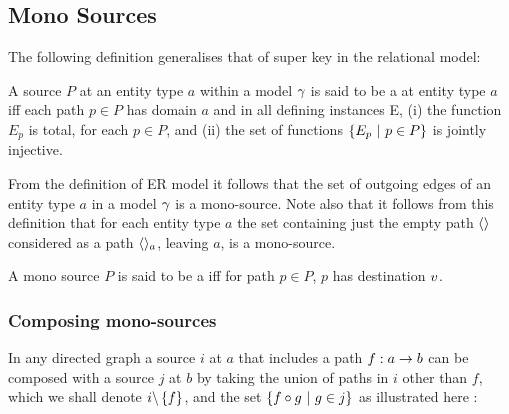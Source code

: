 \subsection{Mono Sources}

The following definition generalises that of super key in the relational model:
\begin{definition}
A source $P$  at an entity type $a$ within a model $\gamma$ is said to be a  at entity type $a$ iff each path $p \in P$ has domain $a$ and  in all defining instances E, 
(i) the function $E_p$ is total, for each $p \in P$, and (ii) the set of functions
$\left\{E_p \ \middle|\ p\in P\right\}$ is jointly injective.
\end{definition}



From the definition of ER model it follows that the set of outgoing edges of an entity type 
$a$ in a model $\gamma$ is a mono-source. Note also that it follows from this definition that for each entity type $a$ the set containing just
the empty path $\langle\rangle$ considered as a path $\langle\rangle_a$, leaving $a$, is a mono-source.  
\begin{definition}
A mono source $P$ is said to be a  iff for path $p \in P$, $p$ has destination $v$.
\end{definition}




\subsubsection{Composing mono-sources}

In any directed graph a source $i$ at $a$ that includes a path $f:a \rightarrow b$ can be composed with a source $j$ at $b$ by taking the union of paths in $i$ other than $f$, which we shall denote $i\backslash \left\{f\right\}$, and the set $\left\{f \circ g \ \middle|\ g \in j\right\}$ as illustrated here :

